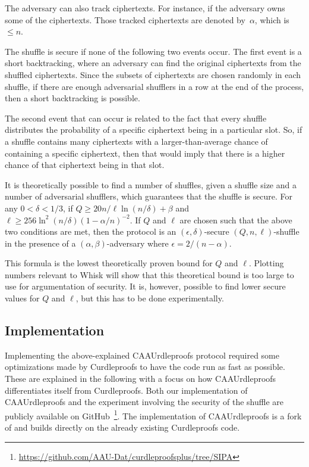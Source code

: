 The adversary can also track ciphertexts.
For instance, if the adversary owns some of the ciphertexts.
Those tracked ciphertexts are denoted by~$\alpha$, which is $\leq n$.

The shuffle is secure if none of the following two events occur.
The first event is a short backtracking, where an adversary can find the original ciphertexts from the shuffled ciphertexts.
Since the subsets of ciphertexts are chosen randomly in each shuffle, if there are enough adversarial shufflers in a row at the end of the process, then a short backtracking is possible.

The second event that can occur is related to the fact that every shuffle distributes the probability of a specific ciphertext being in a particular slot.
So, if a shuffle contains many ciphertexts with a larger-than-average chance of containing a specific ciphertext, then that would imply that there is a higher chance of that ciphertext being in that slot.

It is theoretically possible to find a number of shuffles, given a shuffle size and a number of adversarial shufflers, which guarantees that the shuffle is secure.
For any $0 < \delta < 1/3$, if $Q \geq 20 n / \ell \ln(n/\delta) + \beta $ and $ \ell \geq 256 \ln^2(n/\delta)(1 - \alpha/n)^{-2}$.
If $Q$ and $\ell$ are chosen such that the above two conditions are met, then the protocol is an $(\epsilon , \delta)$-secure $(Q,n,\ell)$-shuffle in the presence of a $(\alpha, \beta)$-adversary where $\epsilon = 2/(n-\alpha)$.

This formula is the lowest theoretically proven bound for $Q$ and $\ell$.
Plotting numbers relevant to Whisk will show that this theoretical bound is too large to use for argumentation of security.
It is, however, possible to find lower secure values for $Q$ and $\ell$, but this has to be done experimentally.


\subsection{Implementation}\label{subsec:approach-implementation}
Implementing the above-explained CAAUrdleproofs protocol required some optimizations made by Curdleproofs to have the code run as fast as possible.
These are explained in the following with a focus on how CAAUrdleproofs differentiates itself from Curdleproofs.
Both our implementation of CAAUrdleproofs and the experiment involving the security of the shuffle are publicly available on GitHub~\footnote{\href{https://github.com/AAU-Dat/curdleproofsplus/tree/SIPA}{https://github.com/AAU-Dat/curdleproofsplus/tree/SIPA}}.
The implementation of CAAUrdleproofs is a fork of and builds directly on the already existing Curdleproofs code.
